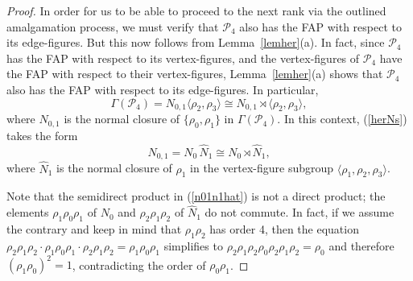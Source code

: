 \documentclass[10pt,a4paper]{amsart}
\theoremstyle{definition}
\begin{document}
\begin{proof}
In order for us to be able to proceed to the next rank via the outlined amalgamation process, we must verify that $\mathcal{P}_4$ also has the FAP with respect to its edge-figures. But this now follows from Lemma~\ref{lemher}(a). In fact, since $\mathcal{P}_4$ has the FAP with respect to its vertex-figures, and the vertex-figures of $\mathcal{P}_4$ have the FAP with respect to their vertex-figures, Lemma~\ref{lemher}(a) shows that $\mathcal{P}_4$ also has the FAP with respect to its edge-figures. In particular, 
\[\Gamma({\mathcal P}_4) = N_{0,1} \langle\rho_2,\rho_3\rangle 
\cong N_{0,1}\rtimes \langle\rho_2,\rho_3\rangle,\]
where $N_{0,1}$ is the normal closure of $\{\rho_0,\rho_1\}$ in $\Gamma({\mathcal P}_4)$. In this context, (\ref{herNs}) takes the form 
\begin{equation}
\label{n01n1hat}
N_{0,1}=N_0 \,\hat{N}_{1} \cong N_0 \rtimes \hat{N}_{1},
\end{equation}
where $\hat{N}_{1}$ is the normal closure of $\rho_1$ in the vertex-figure subgroup $\langle\rho_1,\rho_2,\rho_3\rangle$.

Note that the semidirect product in (\ref{n01n1hat}) is not a direct product; the elements $\rho_{1}\rho_{0}\rho_{1}$ of $N_0$ and $\rho_{2}\rho_{1}\rho_{2}$ of $\hat{N}_{1}$ do not commute.
In fact, if we assume the contrary and keep in mind that $\rho_1\rho_2$ has order 4, then the equation
$\rho_{2}\rho_{1}\rho_{2}\cdot\rho_{1}\rho_{0}\rho_{1} \cdot\rho_{2}\rho_{1}\rho_{2}
=\rho_{1}\rho_{0}\rho_{1}$ simplifies to $\rho_{2}\rho_{1}\rho_{2}\rho_{0}\rho_{2}\rho_{1}\rho_{2}=\rho_0$ and therefore $(\rho_1\rho_0)^2=1$, contradicting the order of $\rho_0 \rho_1$. %


\end{proof}
\end{document}
